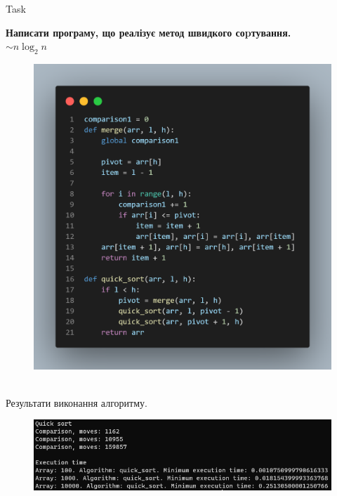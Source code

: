 \documentclass[a4paper,12pt]{article}
\newcommand{\RomanNumeralCaps}[1]{\MakeUppercase{\romannumeral #1}}
\begin{document}
\newpage
    \begin{center}
        \Large{Task \RomanNumeralCaps{2}}
    \end{center}
    \textbf{Написати програму, що реалізує метод швидкого соpтування.} \\
    $\sim n\log_2n$ 
    \begin{figure}[h!]
        \begin{minipage}[h]{1\linewidth}
            \centering
            \includegraphics[width=0.9\linewidth]{Prt sc/Figure_3.png}  
        \end{minipage}
    \end{figure} \\
    Результати виконання алгоритму.
    \begin{figure}[h!]
        \begin{minipage}[h]{1\linewidth}
            \centering
            \includegraphics[width=1\linewidth]{Prt sc/Figure_4.png}
        \end{minipage}
    \end{figure}
\end{document}
